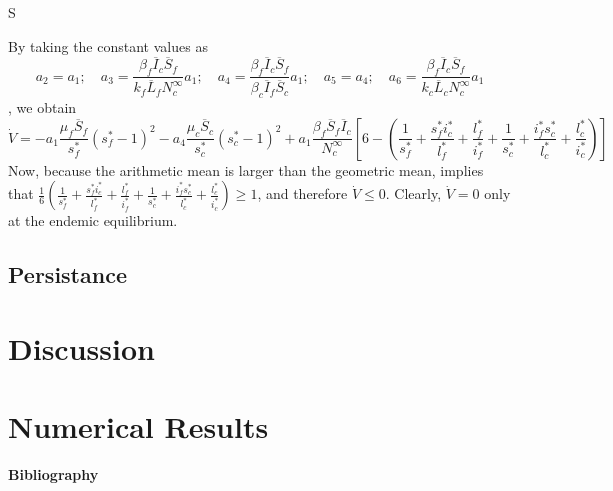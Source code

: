 S\documentclass[preprint,12pt]{elsarticle}
\begin{document}
\noindent By taking the constant values as
$$a_2=a_1;\quad a_3=\frac{\beta_f\overline{I}_c\overline{S}_f}{k_f\overline{L}_f N_c^{\infty}}a_1;\quad a_4=\frac{\beta_f\overline{I}_c\overline{S}_f}{\beta_c\overline{I}_f\overline{S}_c}a_1;\quad a_5=a_4;\quad a_6=\frac{\beta_f\overline{I}_c\overline{S}_f}{k_c\overline{L}_c N_c^{\infty}}a_1 $$,
we obtain
$$\dot{V}= -a_1\frac{\mu_f\overline{S}_f}{s_f^*}\left(s_f^*-1\right)^2-a_4\frac{\mu_c\overline{S}_c}{s_c^*}\left(s_c^*-1\right)^2+a_1\frac{\beta_f\overline{S}_f\overline{I}_c}{N_c^{\infty}}\left[6-\left(\frac{1}{s_f^*}+\frac{s_f^*i_c^*}{l_f^*}+\frac{l_f^*}{i_f^*}+\frac{1}{s_c^*}+\frac{i_f^*s_c^*}{l_c^*}+\frac{l_c^*}{i_c^*}\right)\right]$$
Now, because the arithmetic mean is larger than the geometric mean, implies that  $\frac{1}{6}\left(\frac{1}{s_f^*}+\frac{s_f^*i_c^*}{l_f^*}+\frac{l_f^*}{i_f^*}+\frac{1}{s_c^*}+\frac{i_f^*s_c^*}{l_c^*}+\frac{l_c^*}{i_c^*}\right)\geq 1$, and therefore $\dot{V}\leq 0$. Clearly, $\dot{V} = 0$ only at the endemic equilibrium.


\subsection{Persistance}

\section{Discussion}

\section{Numerical Results}

    

\textbf{Bibliography}


\end{document}
